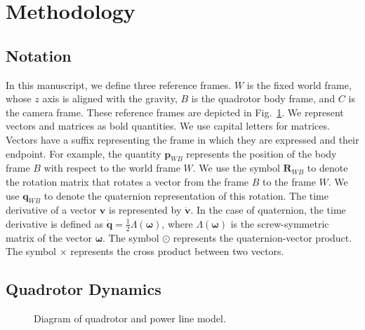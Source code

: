 \section{Methodology} \label{sec:Methodology}

\subsection{Notation}

In this manuscript, we define three reference frames. $W$ is the fixed world frame, whose $z$ axis is aligned with the gravity, $B$ is the quadrotor body frame, and $C$ is the camera frame. These reference frames are depicted in Fig.~\ref{fig:reference_frames}. We represent vectors and matrices as bold quantities. We use capital letters for matrices. Vectors have a suffix representing the frame in which they are expressed and their endpoint. For example, the quantity $\bm{p}_{WB}$ represents the position of the body frame $B$ with respect to the world frame $W$. We use the symbol $\bm{R}_{WB}$ to denote the rotation matrix that rotates a vector from the frame $B$ to the frame $W$. We use $\bm{q}_{WB}$ to denote the quaternion representation of this rotation. The time derivative of a vector $\bm{v}$ is represented by $\dot{\bm{v}}$. In the case of quaternion, the time derivative is defined as $\dot{\bm{q}} = \frac{1}{2} \Lambda (\bm{\omega})$, where $\Lambda(\bm{\omega})$ is the screw-symmetric matrix of the vector $\bm{\omega}$. The symbol $\odot$ represents the quaternion-vector product. The symbol $\times$ represents the cross product between two vectors.

\subsection{Quadrotor Dynamics}
\begin{figure}[t!]
    \centering
    
    \caption{Diagram of quadrotor and power line model.}
    \label{fig:reference_frames}
    \vspace{-1.5ex}
\end{figure}

